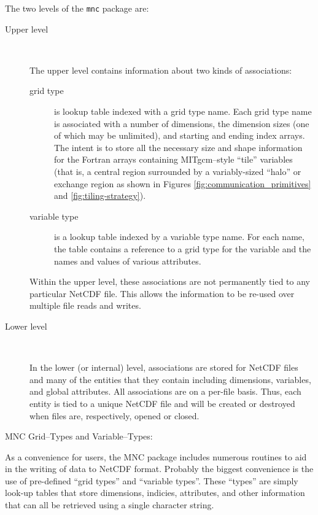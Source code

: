 The two levels of the \texttt{mnc} package are:
\begin{description}

\item[Upper level] \ 
  
  The upper level contains information about two kinds of
  associations:
  \begin{description}
  \item[grid type] is lookup table indexed with a grid type name.
    Each grid type name is associated with a number of dimensions, the
    dimension sizes (one of which may be unlimited), and starting and
    ending index arrays.  The intent is to store all the necessary
    size and shape information for the Fortran arrays containing
    MITgcm--style ``tile'' variables (that is, a central region
    surrounded by a variably-sized ``halo'' or exchange region as
    shown in Figures \ref{fig:communication_primitives} and
    \ref{fig:tiling-strategy}).
  
  \item[variable type] is a lookup table indexed by a variable type
    name.  For each name, the table contains a reference to a grid
    type for the variable and the names and values of various
    attributes.
  \end{description}
  
  Within the upper level, these associations are not permanently tied
  to any particular NetCDF file.  This allows the information to be
  re-used over multiple file reads and writes.

\item[Lower level] \ 
  
  In the lower (or internal) level, associations are stored for NetCDF
  files and many of the entities that they contain including
  dimensions, variables, and global attributes.  All associations are
  on a per-file basis.  Thus, each entity is tied to a unique NetCDF
  file and will be created or destroyed when files are, respectively,
  opened or closed.

\end{description}


MNC Grid--Types and Variable--Types:

As a convenience for users, the MNC package includes numerous routines
to aid in the writing of data to NetCDF format.  Probably the biggest
convenience is the use of pre-defined ``grid types'' and ``variable
types''.  These ``types'' are simply look-up tables that store
dimensions, indicies, attributes, and other information that can all
be retrieved using a single character string.

